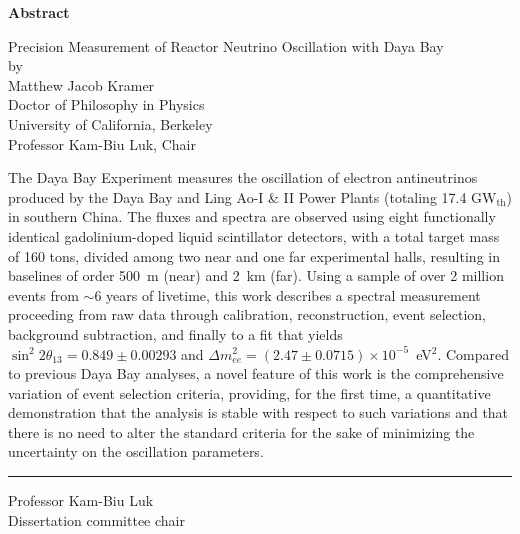 \MyDoubleSpacing

\begin{center}
  \mylarge
  \textbf{Abstract}

  \vspace{1.5\baselineskip}
  Precision Measurement of Reactor Neutrino Oscillation with Daya Bay\\
  \vspace{\baselineskip} by\\
  \vspace{\baselineskip} Matthew Jacob Kramer\\
  Doctor of Philosophy in Physics\\
  University of California, Berkeley\\
  Professor Kam-Biu Luk, Chair
  \vspace{\baselineskip}
\end{center}

\normalsize
\MyDoubleSpacing
\noindent
%
The Daya Bay Experiment measures the oscillation of electron antineutrinos
produced by the Daya Bay and Ling Ao-I \& II Power Plants (totaling 17.4
GW$_\mathrm{th}$) in southern China. The fluxes and spectra are observed using
eight functionally identical gadolinium-doped liquid scintillator detectors,
with a total target mass of 160 tons, divided among two near and one far
experimental halls, resulting in baselines of order 500~m (near) and
2~km (far). Using a sample of over 2 million events from $\sim$6 years of livetime,
this work describes a spectral measurement proceeding from raw data through
calibration, reconstruction, event selection, background subtraction, and
finally to a fit that yields $\sin^2 2\theta_{13} = 0.849 \pm
0.00293$ and $\Delta m^2_{ee} = (2.47 \pm 0.0715) \times 10^{-5}$~eV$^2$.
Compared to previous Daya Bay analyses, a novel feature of this work is
the comprehensive variation of event selection criteria, providing, for the first time, a quantitative demonstration that the analysis is stable with respect to such variations and that there is no need to alter the standard criteria for the sake of minimizing the uncertainty on the oscillation parameters.

\SingleSpacing
\vspace{2.5\baselineskip}
\hfill
\begin{minipage}{0.4\textwidth}
  \hrule\vspace{0.4\baselineskip}
  Professor Kam-Biu Luk\\
  Dissertation committee chair
\end{minipage}

\clearpage